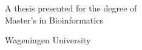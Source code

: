 \documentclass[12pt]{article} %
\providecommand{\keywords}[1]
{
	\small	
	\textbf{\textit{Keywords---}} #1
}
\begin{document}
\begin{titlepage}
\begin{center}
			\vfill
			

			
			
			A thesis presented for the degree of\\
			Master's in Bioinformatics
			
			\vspace{0.8cm}
			
			
			Wageningen University
			
		\end{center}
	\end{titlepage}
	


	
	
	
\end{document}
